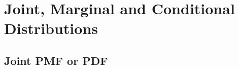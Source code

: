 \documentclass[8pt, usepdftitle = false]{beamer}
\begin{document}




  






\section{Joint, Marginal and Conditional Distributions}


\subsection{Joint PMF or PDF}
\end{document}
